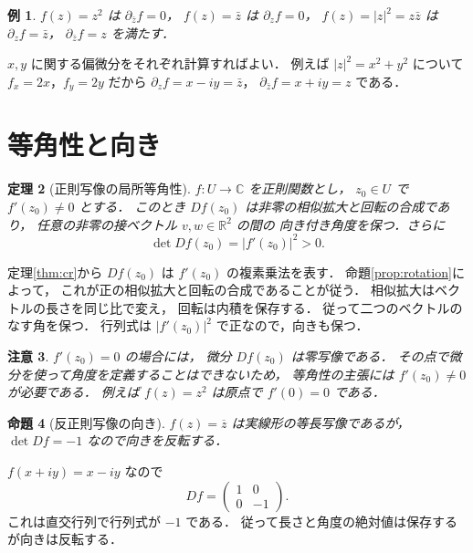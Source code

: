 \documentclass[a5paper,10pt,onecolumn]{jsarticle}
\makeatletter
\theoremstyle{mathnotetheorem}
\newtheorem{theorem}{定理}[section]
\newtheorem{proposition}[theorem]{命題}
\newtheorem{example}[theorem]{例}
\newtheorem{remark}[theorem]{注意}
\renewcommand{\proofname}{証明}
\renewenvironment{proof}[1][\proofname]{%
  \par\pushQED{\qed}\normalfont\topsep4\p@\@plus2\p@\relax
  \trivlist\item[\hskip\labelsep\bfseries #1]\ignorespaces
}{\popQED\endtrivlist\@endpefalse}
\makeatother
\begin{document}
\begin{example}
$f(z)=z^2$ は $\partial_{\bar z}f=0$，
$f(z)=\bar z$ は $\partial_zf=0$，
$f(z)=|z|^2=z\bar z$ は
$\partial_zf=\bar z$，
$\partial_{\bar z}f=z$ を満たす．
\end{example}
\begin{proof}
$x,y$ に関する偏微分をそれぞれ計算すればよい．
例えば $|z|^2=x^2+y^2$ について
$f_x=2x$，$f_y=2y$ だから
$\partial_zf=x-iy=\bar z$，
$\partial_{\bar z}f=x+iy=z$ である．
\end{proof}

\section{等角性と向き}

\begin{theorem}[正則写像の局所等角性]\label{thm:conformal}
$f:U\to\mathbb C$ を正則関数とし，
$z_0\in U$ で $f'(z_0)\ne0$ とする．
このとき $Df(z_0)$ は非零の相似拡大と回転の合成であり，
任意の非零の接ベクトル $v,w\in\mathbb R^2$ の間の
向き付き角度を保つ．さらに
\[
 \det Df(z_0)=|f'(z_0)|^2>0.
\]
\end{theorem}
\begin{proof}
定理\ref{thm:cr}から
$Df(z_0)$ は $f'(z_0)$ の複素乗法を表す．
命題\ref{prop:rotation}によって，
これが正の相似拡大と回転の合成であることが従う．
相似拡大はベクトルの長さを同じ比で変え，
回転は内積を保存する．
従って二つのベクトルのなす角を保つ．
行列式は $|f'(z_0)|^2$ で正なので，向きも保つ．
\end{proof}

\begin{remark}
$f'(z_0)=0$ の場合には，
微分 $Df(z_0)$ は零写像である．
その点で微分を使って角度を定義することはできないため，
等角性の主張には $f'(z_0)\ne0$ が必要である．
例えば $f(z)=z^2$ は原点で $f'(0)=0$ である．
\end{remark}

\begin{proposition}[反正則写像の向き]\label{prop:antihol}
$f(z)=\overline z$ は実線形の等長写像であるが，
$\det Df=-1$ なので向きを反転する．
\end{proposition}
\begin{proof}
$f(x+iy)=x-iy$ なので
\[
 Df=\begin{pmatrix}1&0\\0&-1\end{pmatrix}.
\]
これは直交行列で行列式が $-1$ である．
従って長さと角度の絶対値は保存するが向きは反転する．
\end{proof}
\end{document}
